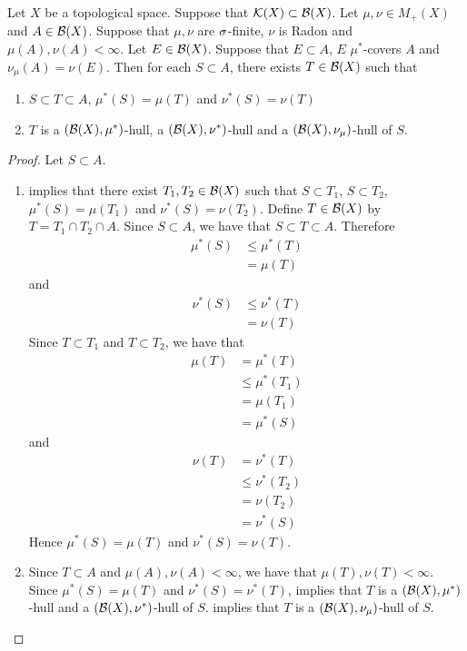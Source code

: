 \documentclass{book}
\begin{document}
	\begin{ex} 
		Let $X$ be a topological space. Suppose that $\mathcal{K}(X) \subset \mathcal{B}(X)$. Let $\mu, \nu \in M_+(X)$ and $A \in \mathcal{B}(X)$. Suppose that $\mu,\nu$ are $\sigma$-finite, $\nu$ is Radon and $\mu(A), \nu(A) < \infty$. Let $E \in \mathcal{B}(X)$. Suppose that $E \subset A$, $E$ $\mu^*$-covers $A$ and $\nu_{\mu}(A) = \nu(E)$. Then for each $S \subset A$, there exists $T \in \mathcal{B}(X)$ such that
		\begin{enumerate}
			\item $S \subset T \subset A$, $\mu^*(S) = \mu(T)$ and $\nu^*(S) = \nu(T)$
			\item $T$ is a $(\mathcal{B}(X), \mu^*)$-hull, a $(\mathcal{B}(X), \nu^*)$-hull and a $(\mathcal{B}(X), \nu_{\mu})$-hull of $S$. 
		\end{enumerate}
	\end{ex}

	\begin{proof} Let $S \subset A$. \begin{enumerate} 
			\item {} implies that there exist $T_1, T_2 \in \mathcal{B}(X)$ such that $S \subset T_1$, $S \subset T_2$, $\mu^*(S) = \mu(T_1)$ and $\nu^*(S) = \nu(T_2)$. Define $T \in \mathcal{B}(X)$ by $T = T_1 \cap T_2 \cap A$. Since $S \subset A$, we have that $S \subset T \subset A$. Therefore 
			\begin{align*}
				\mu^*(S) 
				& \leq \mu^*(T) \\
				& = \mu(T) 
			\end{align*}
			and 
			\begin{align*}
				\nu^*(S) 
				& \leq \nu^*(T) \\
				& = \nu(T) 
			\end{align*}
			Since $T \subset T_1$ and $T \subset T_2$, we have that 
			\begin{align*}
				\mu(T) 
				& = \mu^*(T) \\
				& \leq \mu^*(T_1) \\
				& = \mu(T_1) \\
				& = \mu^*(S) 
			\end{align*}
			and 
			\begin{align*}
				\nu(T) 
				& = \nu^*(T) \\
				& \leq \nu^*(T_2) \\
				& = \nu(T_2) \\
				& = \nu^*(S) 
			\end{align*}
			Hence $\mu^*(S) = \mu(T)$ and $\nu^*(S) = \nu(T)$.
			\item Since $ T \subset A$ and $\mu(A), \nu(A) < \infty$, we have that $\mu(T), \nu(T) < \infty$. Since $\mu^*(S) = \mu(T)$ and $\nu^*(S) = \nu^*(T)$,  implies that $T$ is a $(\mathcal{B}(X), \mu^*)$-hull and a $(\mathcal{B}(X), \nu^*)$-hull of $S$.  implies that $T$ is a $(\mathcal{B}(X), \nu_{\mu})$-hull of $S$.
		\end{enumerate}
	\end{proof}
	
\end{document}
